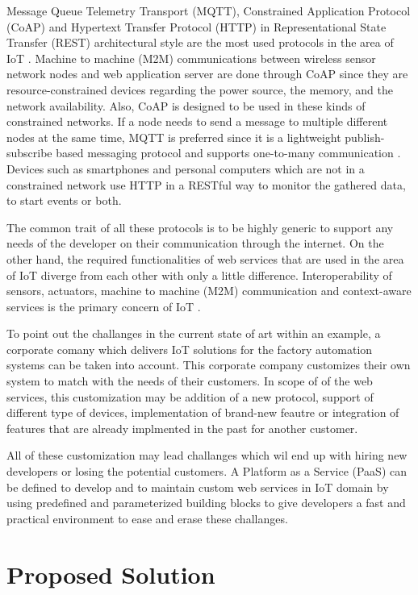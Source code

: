  Message Queue Telemetry Transport (MQTT), Constrained Application Protocol (CoAP) and Hypertext Transfer Protocol (HTTP) in Representational State Transfer (REST) architectural style are the most used protocols in the area of IoT \cite{8246418,8070130}. Machine to machine (M2M) communications between wireless sensor network nodes and web application server are done through CoAP since they are resource-constrained devices regarding the power source, the memory, and the network availability. Also, CoAP is designed to be used in these kinds of constrained networks. If a node needs to send a message to multiple different nodes at the same time, MQTT is preferred since it is a lightweight publish-subscribe based messaging protocol and supports one-to-many communication \cite{mqtt}. Devices such as smartphones and personal computers which are not in a constrained network use HTTP in a RESTful way to monitor the gathered data, to start events or both.

 The common trait of all these protocols is to be highly generic to support any needs of the developer on their communication through the internet. On the other hand, the required functionalities of web services that are used in the area of IoT diverge from each other with only a little difference. Interoperability of sensors, actuators, machine to machine (M2M) communication and context-aware services is the primary concern of IoT \cite{6651222}. 

To point out the challanges in the current state of art within an example, a corporate comany which delivers IoT solutions for the factory automation systems can be taken into account. This corporate company customizes their own system to match with the needs of their customers. In scope of of the web services, this customization may be addition of a new protocol, support of different type of devices, implementation of brand-new feautre or integration of features that are already implmented in the past for another customer.

All of these customization may lead challanges which wil end up with hiring new developers or losing the potential customers. A Platform as a Service (PaaS) can be defined to develop and to maintain custom web services in IoT domain by using predefined and parameterized building blocks to give developers a fast and practical environment to ease and erase these challanges.

\section{Proposed Solution}

